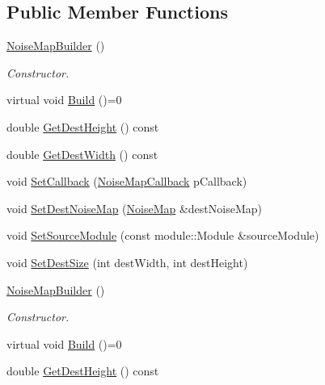 \subsection*{Public Member Functions}
\begin{DoxyCompactItemize}
\item 
\hyperlink{classnoise_1_1utils_1_1_noise_map_builder_adbbffa06dd4de296fbd0c8a395aa444b}{Noise\+Map\+Builder} ()
\begin{DoxyCompactList}\small\item\em Constructor. \end{DoxyCompactList}\item 
virtual void \hyperlink{classnoise_1_1utils_1_1_noise_map_builder_abe0e5f01c696c2290792c8f8736e3ed1}{Build} ()=0
\item 
double \hyperlink{classnoise_1_1utils_1_1_noise_map_builder_aef40bf8315cf974a468b1c8b5d0f857e}{Get\+Dest\+Height} () const 
\item 
double \hyperlink{classnoise_1_1utils_1_1_noise_map_builder_a911a54e1d86b59beaad313b54c7c715e}{Get\+Dest\+Width} () const 
\item 
void \hyperlink{classnoise_1_1utils_1_1_noise_map_builder_ac760187423eb5e16ac015f9beafd78ea}{Set\+Callback} (\hyperlink{namespacenoise_1_1utils_af10741a3394fadf8798a8f40b753b208}{Noise\+Map\+Callback} p\+Callback)
\item 
void \hyperlink{classnoise_1_1utils_1_1_noise_map_builder_a07555b64324efbb16f0ef244c4fed8b7}{Set\+Dest\+Noise\+Map} (\hyperlink{classnoise_1_1utils_1_1_noise_map}{Noise\+Map} \&dest\+Noise\+Map)
\item 
void \hyperlink{classnoise_1_1utils_1_1_noise_map_builder_aa39e8ea292711aa3a7627ddcaee4f12f}{Set\+Source\+Module} (const module\+::\+Module \&source\+Module)
\item 
void \hyperlink{classnoise_1_1utils_1_1_noise_map_builder_abad282f0cbe67824b73c580f611a7bd0}{Set\+Dest\+Size} (int dest\+Width, int dest\+Height)
\item 
\hyperlink{classnoise_1_1utils_1_1_noise_map_builder_a6a866e7ae94d27a34cc322e4d43cb51e}{Noise\+Map\+Builder} ()
\begin{DoxyCompactList}\small\item\em Constructor. \end{DoxyCompactList}\item 
virtual void \hyperlink{classnoise_1_1utils_1_1_noise_map_builder_abe0e5f01c696c2290792c8f8736e3ed1}{Build} ()=0
\item 
double \hyperlink{classnoise_1_1utils_1_1_noise_map_builder_aef40bf8315cf974a468b1c8b5d0f857e}{Get\+Dest\+Height} () const 

\end{DoxyCompactItemize}
